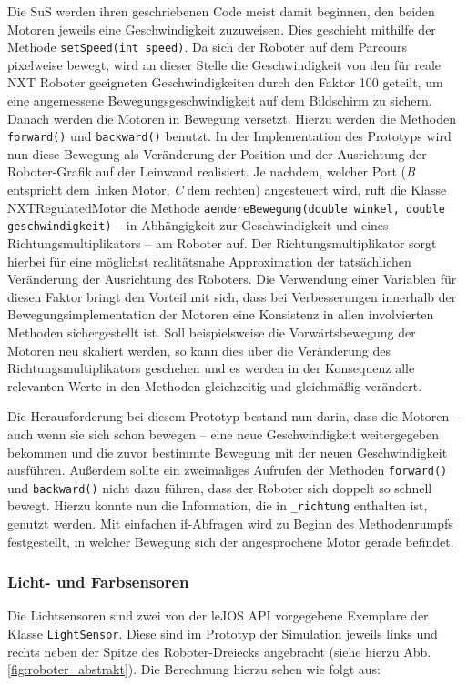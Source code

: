 \documentclass[paper=a4, DIV=calc, BCOR=12mm, twoside=on, onecolumn=on, open = right, titlepage =on, parskip =half-, headsepline = on, footsepline = off, chapterprefix = off, appendixprefix = on, fontsize = 12pt, numbers = noenddot, abstract = on]{scrbook}
\begin{document}
Die SuS werden ihren geschriebenen Code meist damit beginnen, den beiden Motoren jeweils eine Geschwindigkeit zuzuweisen. Dies geschieht mithilfe der Methode \texttt{setSpeed(int speed)}. Da sich der Roboter auf dem Parcours pixelweise bewegt, wird an dieser Stelle die Geschwindigkeit von den für reale NXT Roboter geeigneten Geschwindigkeiten durch den Faktor 100 geteilt, um eine angemessene Bewegungsgeschwindigkeit auf dem Bildschirm zu sichern.\\
Danach werden die Motoren in Bewegung versetzt. Hierzu werden die Methoden \texttt{forward()} und \texttt{backward()} benutzt. In der Implementation des Prototyps wird nun diese Bewegung als Veränderung der Position und der Ausrichtung der Roboter-Grafik auf der Leinwand realisiert. Je nachdem, welcher Port (\emph{B} entspricht dem linken Motor, \emph{C} dem rechten) angesteuert wird, ruft die Klasse NXTRegulatedMotor die Methode \texttt{aendereBewegung(double winkel, double geschwindigkeit)} -- in Abhängigkeit zur Geschwindigkeit und eines Richtungsmultiplikators -- am Roboter auf. Der Richtungsmultiplikator sorgt hierbei für eine möglichst realitätsnahe Approximation der tatsächlichen Veränderung der Ausrichtung des Roboters. Die Verwendung einer Variablen für diesen Faktor bringt den Vorteil mit sich, dass bei Verbesserungen innerhalb der Bewegungsimplementation der Motoren eine Konsistenz in allen involvierten Methoden sichergestellt ist. Soll beispielsweise die Vorwärtsbewegung der Motoren neu skaliert werden, so kann dies über die Veränderung des Richtungsmultiplikators geschehen und es werden in der Konsequenz alle relevanten Werte in den Methoden gleichzeitig und gleichmäßig verändert. 

Die Herausforderung bei diesem Prototyp bestand nun darin, dass die Motoren -- auch wenn sie sich schon bewegen -- eine neue Geschwindigkeit weitergegeben bekommen und die zuvor bestimmte Bewegung mit der neuen Geschwindigkeit ausführen. Außerdem sollte ein zweimaliges Aufrufen der Methoden \texttt{forward()} und \texttt{backward()} nicht dazu führen, dass der Roboter sich doppelt so schnell bewegt. Hierzu konnte nun die Information, die in  \texttt{{\_}richtung} enthalten ist, genutzt werden. Mit einfachen if-Abfragen wird zu Beginn des Methodenrumpfs festgestellt, in welcher Bewegung sich der angesprochene Motor gerade befindet. 


\subsubsection{Licht- und Farbsensoren}
Die Lichtsensoren sind zwei von der leJOS API vorgegebene Exemplare der Klasse \texttt{LightSensor}. Diese sind im Prototyp der Simulation jeweils links und rechts neben der Spitze des Roboter-Dreiecks angebracht (siehe hierzu Abb. \ref{fig:roboter_abstrakt}). Die Berechnung hierzu sehen wie folgt aus:
\end{document}
